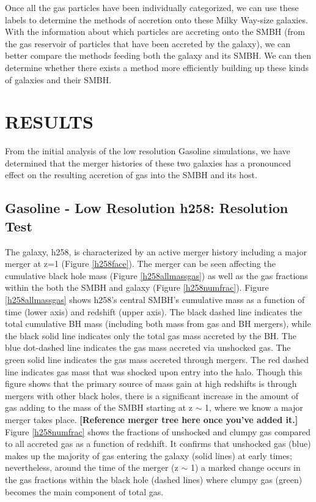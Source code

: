 \documentclass[12pt,headA,chapB]{fiskthesis}
\begin{document}
Once all the gas particles have been individually categorized, we can use these labels to determine the methods of accretion onto these Milky Way-size galaxies. With the information about which particles are accreting onto the SMBH (from the gas reservoir of particles that have been accreted by the galaxy), we can better compare the methods feeding both the galaxy and its SMBH. We can then determine whether there exists a method more efficiently building up these kinds of galaxies and their SMBH.


\chapter{\normalsize RESULTS}
\thispagestyle{empty}
From the initial analysis of the low resolution Gasoline simulations, we have determined that the merger histories of these two galaxies has a pronounced effect on the resulting accretion of gas into the SMBH and its host. 

\section{Gasoline - Low Resolution h258: Resolution Test}
	
The galaxy, h258, is characterized by an active merger history including a major merger at z=1 (Figure \ref{h258face}). The merger can be seen affecting the cumulative black hole mass (Figure \ref{h258allmassgas}) as well as the gas fractions within the both the SMBH and galaxy (Figure \ref{h258numfrac}). 
Figure \ref{h258allmassgas} shows h258's central SMBH's cumulative mass as a function of time (lower axis) and redshift (upper axis). The black dashed line indicates the total cumulative BH mass (including both mass from gas and BH mergers), while the black solid line indicates only the total gas mass accreted by the BH. The blue dot-dashed line indicates the gas mass accreted via unshocked gas. The green solid line indicates the gas mass accreted through mergers. The red dashed line indicates gas mass that was shocked upon entry into the halo. Though this figure shows that the primary source of mass gain at high redshifts is through mergers with other black holes, there is a significant increase in the amount of gas adding to the mass of the SMBH starting at z $\sim$ 1, where we know a major merger takes place. \textbf{[Reference merger tree here once you've added it.]} Figure \ref{h258numfrac} shows the fractions of unshocked and clumpy gas compared to all accreted gas as a function of redshift. It confirms that unshocked gas (blue) makes up the majority of gas entering the galaxy (solid lines) at early times; nevertheless, around the time of the merger (z $\sim$ 1) a marked change occurs in the gas fractions within the black hole (dashed lines) where clumpy gas (green) becomes the main component of total gas. 
\end{document}
